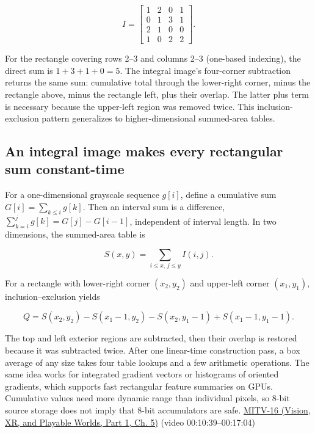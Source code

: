 \[
I=\begin{bmatrix}1&2&0&1\\0&1&3&1\\2&1&0&0\\1&0&2&2\end{bmatrix}.
\]

For the rectangle covering rows 2--3 and columns 2--3 (one-based indexing), the direct sum is \(1+3+1+0=5\). The integral image's four-corner subtraction returns the same sum: cumulative total through the lower-right corner, minus the rectangle above, minus the rectangle left, plus their overlap. The latter plus term is necessary because the upper-left region was removed twice. This inclusion-exclusion pattern generalizes to higher-dimensional summed-area tables.

\subsection{An integral image makes every rectangular sum constant-time}\label{03-visual-computing-i-ch004-an-integral-image-makes-every-rectangular-sum-constant-time}

\hypertarget{03-visual-computing-i-ch004-an-integral-image-makes-every-rectangular-sum-constant-time}{}

For a one-dimensional grayscale sequence \(g[i]\), define a cumulative sum \(G[i]=\sum_{k\le i}g[k]\). Then an interval sum is a difference, \(\sum_{k=i}^{j}g[k]=G[j]-G[i-1]\), independent of interval length. In two dimensions, the summed-area table is

\[
S(x,y)=\sum_{i\le x,\,j\le y}I(i,j).
\]

For a rectangle with lower-right corner \((x_2,y_2)\) and upper-left corner \((x_1,y_1)\), inclusion--exclusion yields

\[
Q=S(x_2,y_2)-S(x_1-1,y_2)-S(x_2,y_1-1)+S(x_1-1,y_1-1).
\]

The top and left exterior regions are subtracted, then their overlap is restored because it was subtracted twice. After one linear-time construction pass, a box average of any size takes four table lookups and a few arithmetic operations. The same idea works for integrated gradient vectors or histograms of oriented gradients, which supports fast rectangular feature summaries on GPUs. Cumulative values need more dynamic range than individual pixels, so 8-bit source storage does not imply that 8-bit accumulators are safe. \href{../07-Vision-XR-and-Playable-Worlds-P01/main.pdf\#nameddest=04-visual-computing-ii-ch036-mitv-16---fast-convolution-low-pass-filter-approximations-integral-images-us-6457032}{MITV-16 (Vision, XR, and Playable Worlds, Part 1, Ch. 5)} (video 00:10:39--00:17:04)

